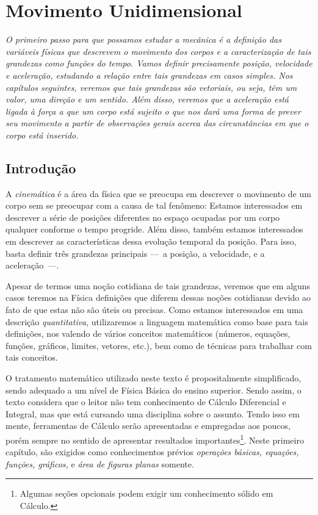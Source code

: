 \chapter{Movimento Unidimensional}
\label{Chap:MovimentoUnidimensional}



\begin{fullwidth}
{\it
O primeiro passo para que possamos estudar a mecânica é a definição das variáveis físicas que descrevem o movimento dos corpos e a caracterização de tais grandezas como funções do tempo. Vamos definir precisamente posição, velocidade e aceleração, estudando a relação entre tais grandezas em casos simples. Nos capítulos seguintes, veremos que tais grandezas são vetoriais, ou seja, têm um valor, uma direção e um sentido. Além disso, veremos que a aceleração está ligada à força a que um corpo está sujeito o que nos dará uma forma de prever seu movimento a partir de observações gerais acerca das circunstâncias em que o corpo está inserido.
}
\end{fullwidth}

\section{Introdução}

A \emph{cinemática} é a área da física que se preocupa em descrever o movimento de um corpo sem se preocupar com a causa de tal fenômeno: Estamos interessados em descrever a série de posições diferentes no espaço ocupadas por um corpo qualquer conforme o tempo progride. Além disso, também estamos interessados em descrever as características dessa evolução temporal da posição. Para isso, basta definir três grandezas principais ---~a posição, a velocidade, e a aceleração~---.

Apesar de termos uma noção cotidiana de tais grandezas, veremos que em alguns casos teremos na Física definições que diferem dessas noções cotidianas devido ao fato de que estas não são úteis ou precisas. Como estamos interessados em uma descrição \emph{quantitativa}, utilizaremos a linguagem matemática como base para tais definições, nos valendo de vários conceitos matemáticos (números, equações, funções, gráficos, limites, vetores, etc.), bem como de técnicas para trabalhar com tais conceitos.

O tratamento matemático utilizado neste texto é propositalmente simplificado, sendo adequado a um nível de Física Básica do ensino superior. Sendo assim, o texto considera que o leitor não tem conhecimento de Cálculo Diferencial e Integral, mas que está cursando uma disciplina sobre o assunto. Tendo isso em mente, ferramentas de Cálculo serão apresentadas e empregadas aos poucos, porém sempre no sentido de apresentar resultados importantes\footnote{Algumas seções opcionais podem exigir um conhecimento sólido em Cálculo.}. Neste primeiro capítulo, são exigidos como conhecimentos prévios \emph{operações básicas, equações, funções, gráficos,} e \emph{área de figuras planas} somente.

